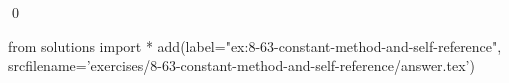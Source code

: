 
\begin{ex}
  \label{ex:8-63-constant-method-and-self-reference}
  
  \qed
\end{ex}
\begin{python0}
from solutions import *
add(label="ex:8-63-constant-method-and-self-reference",
    srcfilename='exercises/8-63-constant-method-and-self-reference/answer.tex')
\end{python0}

